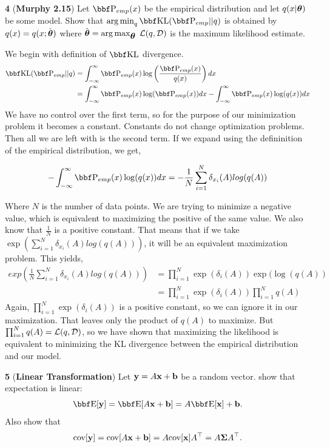 \documentclass[12pt,letterpaper,fleqn]{hmcpset}
\begin{document}
\newpage




\textbf{4} (\textbf{Murphy 2.15}) Let $\PP_{emp}(x)$ be the empirical distribution and let
$q(x|\hbox{\boldmath$\theta$})$ be some model. Show that $\argmin_q \KL(\PP_{emp} || q)$ is obtained by
$q(x) = q(x ; \hat{\hbox{\boldmath$\theta$}})$ where $\hat{\hbox{\boldmath$\theta$}} = \operatorname*{arg\,max}_{\hbox{\boldmath$\theta$}} \;{\cal L}(q, {\cal D})$ is
the maximum likelihood estimate.

\vspace{15mm}
We begin with definition of $\KL$ divergence.
\begin{align*}
    \KL(\PP_{emp} || q) &= \int_{-\infty}^{\infty}\PP_{emp}(x)\log \left(\frac{\PP_{emp}(x)}{q(x)} \right)dx\\
    &= \int_{-\infty}^{\infty}\PP_{emp}(x)\log(\PP_{emp}(x))dx - \int_{-\infty}^{\infty}\PP_{emp}(x)\log(q(x))dx\\
\end{align*}
We have no control over the first term, so for the purpose of our minimization problem it becomes a constant. Constants do not change optimization problems. Then all we are left with is the second term. If we expand using the defininition of the empirical distribution, we get,

    $$- \int_{-\infty}^{\infty}\PP_{emp}(x)\log(q(x))dx = -\frac{1}{N}\sum_{i=1}^{N}\delta_{x_i}(A)log(q(A))$$

Where $N$ is the number of data points. We are trying to minimize a negative value, which is equivalent to maximizing the positive of the same value. We also know that $\frac{1}{N}$ is a positive constant. That means that if we take $\exp(\sum_{i=1}^{N}\delta_{x_i}(A)log(q(A)))$, it will be an equivalent maximization problem. This yields,
\begin{align*}
    exp(\frac{1}{N}\sum_{i=1}^{N}\delta_{x_i}(A)log(q(A))) &= \prod_{i=1}^N \exp(\delta_i(A))\exp(\log(q(A))\\
    &= \prod_{i=1}^N \exp(\delta_i(A)) \prod_{i=1}^N q(A)
\end{align*}
Again, $\prod_{i=1}^N \exp(\delta_i(A))$ is a positive constant, so we can ignore it in our maximization. That leaves only the product of $q(A)$ to maximize. But $\prod_{i=1}^N q(A) = {\cal L}(q,{\cal D})$, so we have shown that maximizing the likelihood is equivalent to minimizing the KL divergence between the empirical distribution and our model.

\newpage

\textbf{5} (\textbf{Linear Transformation}) Let ${\bf y} = A{\bf x} + {\bf b}$ be a random vector.
show that expectation is linear:
\[
    \EE[\yy] = \EE[A\xx + \bb] = A\EE[\xx] + \bb.
\]
Also show that
\[
    {\hbox{cov}}[{\bf y}] = {\hbox{cov}}[A{\bf x} + {\bf b}] = A {\hbox{cov}}[{\bf x}] A^\top = A\hbox{\boldmath$\Sigma$} A^\top.
\]
\end{document}
